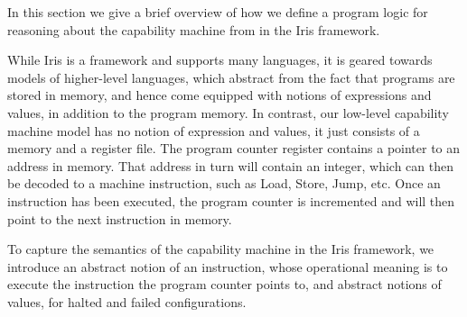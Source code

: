 \documentclass[sigplan,review]{acmart}\settopmatter{printfolios=true,printccs=false,printacmref=false}
\begin{document}

In this section we give a brief overview of how we define a program logic
for reasoning about the capability machine from \cite{skorstengaardESOP18} in the Iris framework.

While Iris is a framework and supports many languages, it is geared towards models of higher-level languages, which abstract from the fact that programs are stored in memory, and hence come equipped with notions of expressions and values, in addition to the program memory.
In contrast, our low-level capability machine model has no notion of expression and values, it just consists of a memory and a register file.
The program counter register contains a pointer to an address in memory.
That address in turn will contain an integer, which can then be decoded to a machine instruction, such as Load, Store, Jump, etc.
Once an instruction has been executed, the program counter is incremented and will then point to the next instruction in memory.

To capture the semantics of the capability machine in the Iris framework, we introduce an abstract notion of an instruction, whose operational meaning is to execute the instruction the program counter points to, and abstract notions of values, for halted and failed configurations.
\end{document}
